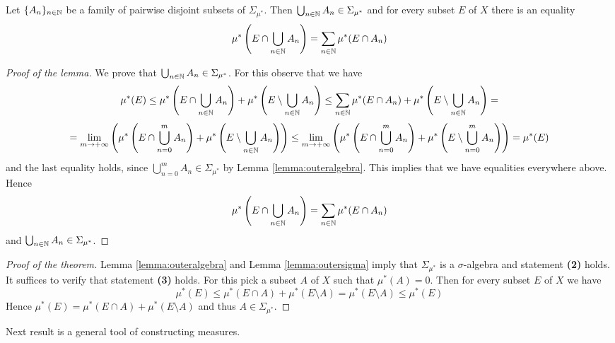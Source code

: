 \begin{lemma}\label{lemma:outersigma}
Let $\{A_n\}_{n\in {\mathbb N}}$ be a family of pairwise disjoint subsets of $\Sigma_{\mu^*}$. Then $\bigcup_{n\in {\mathbb N}}A_n\in \Sigma_{\mu^*}$ and for every subset $E$ of $X$ there is an equality
$$\mu^*\left(E\cap \bigcup_{n\in {\mathbb N}}A_n\right)=\sum_{n\in {\mathbb N}}\mu^*(E\cap A_n)$$
\end{lemma}
\begin{proof}[Proof of the lemma]
We prove that $\bigcup_{n\in {\mathbb N}}A_n\in \Sigma_{\mu^*}$. For this observe that we have 
$$\mu^*(E) \leq \mu^*\left(E\cap \bigcup_{n\in {\mathbb N}}A_n\right)+\mu^*\left(E\setminus \bigcup_{n\in {\mathbb N}}A_n\right) \leq  \sum_{n\in {\mathbb N}}\mu^*(E\cap A_n)+\mu^*\left(E\setminus \bigcup_{n\in {\mathbb N}}A_n\right) =$$
$$= \lim_{m\rightarrow +\infty}\left(\mu^*\left(E\cap \bigcup_{n=0}^mA_n\right)+\mu^*\left(E\setminus \bigcup_{n\in {\mathbb N}}A_n\right)\right)\leq \lim_{m\rightarrow +\infty}\left(\mu^*\left(E\cap \bigcup_{n=0}^mA_n\right)+\mu^*\left(E\setminus \bigcup_{n=0}^{m}A_n\right)\right) = \mu^*(E)$$
and the last equality holds, since $\bigcup_{n=0}^mA_n\in \Sigma_{\mu^*}$ by Lemma \ref{lemma:outeralgebra}. This implies that we have equalities everywhere above. Hence
$$\mu^*\left(E\cap \bigcup_{n\in {\mathbb N}}A_n\right)= \sum_{n\in {\mathbb N}}\mu^*(E\cap A_n)$$
and $\bigcup_{n\in {\mathbb N}}A_n\in \Sigma_{\mu^*}$.
\end{proof}

\begin{proof}[Proof of the theorem]
Lemma \ref{lemma:outeralgebra} and Lemma \ref{lemma:outersigma} imply that $\Sigma_{\mu^*}$ is a $\sigma$-algebra and statement \textbf{(2)} holds. It suffices to verify that statement \textbf{(3)} holds. For this pick a subset $A$ of $X$ such that $\mu^*(A)=0$. Then for every subset $E$ of $X$ we have
$$\mu^*(E)\leq \mu^*(E\cap A)+\mu^*(E\setminus A)=\mu^*(E\setminus A)\leq \mu^*(E)$$
Hence $\mu^*(E)=\mu^*(E\cap A)+\mu^*(E\setminus A)$ and thus $A\in \Sigma_{\mu^*}$.
\end{proof}
\noindent
Next result is a general tool of constructing measures.

